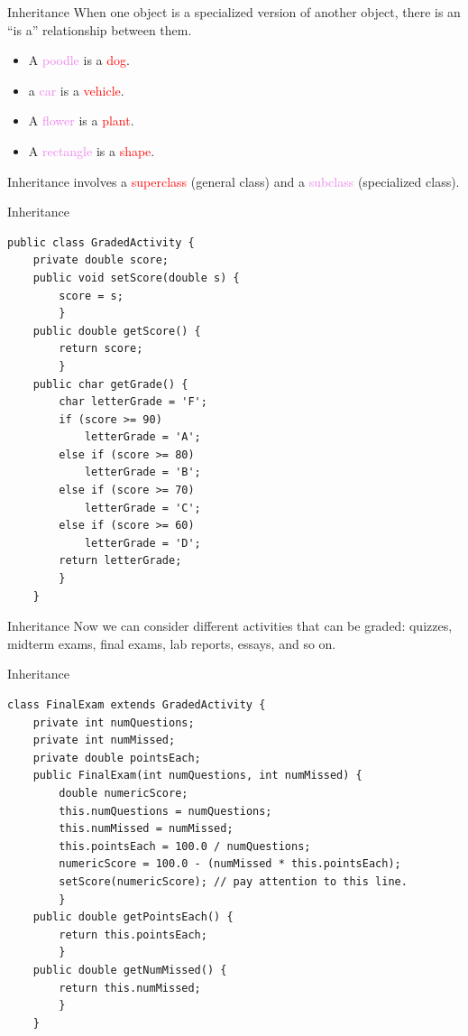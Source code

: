 \documentclass[11pt]{beamer}
\newcommand{\red}[1]{\textcolor{red}{#1}}
\newcommand{\violet}[1]{\textcolor{violet}{#1}}
\begin{document}
\begin{frame}{Inheritance}
    When one object is a specialized version of another object, there is an ``is a'' relationship between them.
    \begin{itemize}
        \item A \violet{poodle} is a \red{dog}.
        \item a \violet{car} is a \red{vehicle}.
        \item A \violet{flower} is a \red{plant}.
        \item A \violet{rectangle} is a \red{shape}.
    \end{itemize}
    Inheritance involves a \red{superclass} (general class) and a \violet{subclass} (specialized class).
\end{frame}

\begin{frame}[fragile]{Inheritance}
    \begin{lstlisting}[basicstyle=\ttfamily\footnotesize]
public class GradedActivity {
    private double score;
    public void setScore(double s) {
        score = s;
        }
    public double getScore() {
        return score;
        }
    public char getGrade() {
        char letterGrade = 'F';
        if (score >= 90)
            letterGrade = 'A';
        else if (score >= 80)
            letterGrade = 'B';
        else if (score >= 70)
            letterGrade = 'C';
        else if (score >= 60)
            letterGrade = 'D';
        return letterGrade;
        }
    }
    \end{lstlisting}
\end{frame}

\begin{frame}[fragile]{Inheritance}
    Now we can consider different activities that can be graded: quizzes, midterm exams, final exams, lab reports, essays, and so on.
\end{frame}

\begin{frame}[fragile]{Inheritance}
\begin{lstlisting}[basicstyle=\ttfamily\footnotesize]
class FinalExam extends GradedActivity {
	private int numQuestions;
	private int numMissed;
	private double pointsEach;
	public FinalExam(int numQuestions, int numMissed) {
		double numericScore;
		this.numQuestions = numQuestions;
		this.numMissed = numMissed;
		this.pointsEach = 100.0 / numQuestions;
		numericScore = 100.0 - (numMissed * this.pointsEach);
		setScore(numericScore); // pay attention to this line.
		}
	public double getPointsEach() {
		return this.pointsEach;
		}
	public double getNumMissed() {
		return this.numMissed;
		}
	}
\end{lstlisting}
\end{frame}
\end{document}
